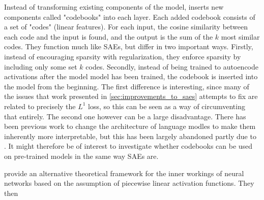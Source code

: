 \documentclass[../../main.tex]{subfiles}
\begin{document}
Instead of transforming existing components of the model, \citet{tamkin_codebook_2023} inserts new components called "codebooks" into each layer.
Each added codebook consists of a set of "codes" (linear features).
For each input, the cosine similarity between each code and the input is found, and the output is the sum of the $k$ most similar codes. 
They function much like SAEs, but differ in two important ways.
Firstly, instead of encouraging sparsity with regularization, they enforce sparsity by including only some set $k$ codes.
Secondly, instead of being trained to autoencode activations after the model model has been trained, the codebook is inserted into the model from the beginning.
The first difference is interesting, since many of the issues that work presented in \ref{sec:improvements_to_saes} attempts to fix are related to precisely the $L^1$ loss, so this can be seen as a way of circumventing that entirely.
The second one however can be a large disadvantage.
There has been previous work \citep{elhage_softmax_2022} to change the architecture of language modles to make them inherently more interpretable, but this has been largely abandoned partly due to .
It might therefore be of interest to investigate whether codebooks can be used on pre-trained models in the same way SAEs are.


\citet{black_interpreting_2022} provide an alternative theoretical framework for the inner workings of neural networks based on the assumption of piecewise linear activation functions.
They then 


\end{document}
